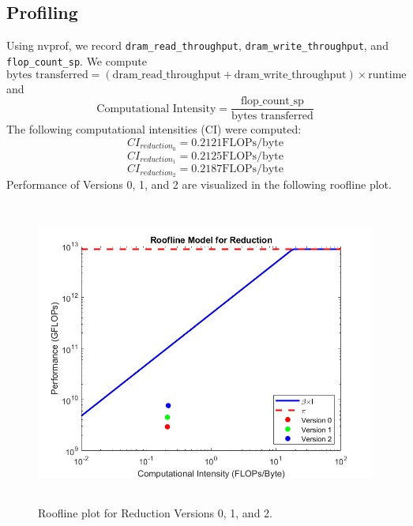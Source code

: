 \documentclass{article}
\begin{document}
\subsection*{Profiling}
Using nvprof, we record \verb|dram_read_throughput|, \verb|dram_write_throughput|, and \verb|flop_count_sp|. 
We compute
\[
\text{bytes transferred} = (\text{dram\_read\_throughput} + \text{dram\_write\_throughput}) \times \text{runtime}
\]
and
\[
\text{Computational Intensity} = \frac{\text{flop\_count\_sp}}{\text{bytes transferred}}
\]
The following computational intensities (CI) were computed:
\[
CI_{reduction_0} = 0.2121 \text{FLOPs/byte}
\]
\[
CI_{reduction_1} = 0.2125 \text{FLOPs/byte}
\]
\[
CI_{reduction_2} = 0.2187 \text{FLOPs/byte}
\]
Performance of Versions 0, 1, and 2 are visualized in the following roofline plot.
\begin{figure}
    \centering
    \includegraphics[height=10cm]{roofline_reduction.jpg}
    \caption{Roofline plot for Reduction Versions 0, 1, and 2.}
    \label{fig:enter-label}
\end{figure}
\end{document}
